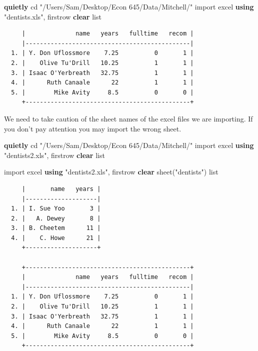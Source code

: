 \documentclass[
]{book}
\newenvironment{Shaded}{\begin{snugshade}}{\end{snugshade}}
\newcommand{\KeywordTok}[1]{\textcolor[rgb]{0.13,0.29,0.53}{\textbf{#1}}}
\newcommand{\NormalTok}[1]{#1}
\newcommand{\OtherTok}[1]{\textcolor[rgb]{0.56,0.35,0.01}{#1}}
\newcommand{\StringTok}[1]{\textcolor[rgb]{0.31,0.60,0.02}{#1}}
\begin{document}
\begin{Shaded}
\begin{Highlighting}[]
\KeywordTok{quietly}\NormalTok{ cd }\StringTok{"/Users/Sam/Desktop/Econ 645/Data/Mitchell/"}
\NormalTok{import excel }\KeywordTok{using} \StringTok{"dentists.xls"}\NormalTok{, firstrow }\KeywordTok{clear}
\OtherTok{list} 
\end{Highlighting}
\end{Shaded}

\begin{verbatim}
     |              name   years   fulltime   recom |
     |----------------------------------------------|
  1. | Y. Don Uflossmore    7.25          0       1 |
  2. |    Olive Tu'Drill   10.25          1       1 |
  3. | Isaac O'Yerbreath   32.75          1       1 |
  4. |      Ruth Canaale      22          1       1 |
  5. |        Mike Avity     8.5          0       0 |
     +----------------------------------------------+
\end{verbatim}

We need to take caution of the sheet names of the excel files we are importing. If you don't pay attention you may import the wrong sheet.

\begin{Shaded}
\begin{Highlighting}[]
\KeywordTok{quietly}\NormalTok{ cd }\StringTok{"/Users/Sam/Desktop/Econ 645/Data/Mitchell/"}
\NormalTok{import excel }\KeywordTok{using} \StringTok{"dentists2.xls"}\NormalTok{, firstrow }\KeywordTok{clear}
\OtherTok{list}

\NormalTok{import excel }\KeywordTok{using} \StringTok{"dentists2.xls"}\NormalTok{, firstrow }\KeywordTok{clear}\NormalTok{ sheet(}\StringTok{"dentists"}\NormalTok{)}
\OtherTok{list}
\end{Highlighting}
\end{Shaded}

\begin{verbatim}
     |       name   years |
     |--------------------|
  1. | I. Sue Yoo       3 |
  2. |   A. Dewey       8 |
  3. | B. Cheetem      11 |
  4. |    C. Howe      21 |
     +--------------------+

     +----------------------------------------------+
     |              name   years   fulltime   recom |
     |----------------------------------------------|
  1. | Y. Don Uflossmore    7.25          0       1 |
  2. |    Olive Tu'Drill   10.25          1       1 |
  3. | Isaac O'Yerbreath   32.75          1       1 |
  4. |      Ruth Canaale      22          1       1 |
  5. |        Mike Avity     8.5          0       0 |
     +----------------------------------------------+
\end{verbatim}
\end{document}
